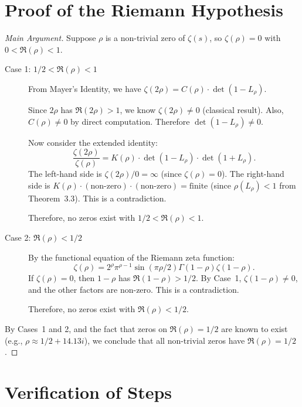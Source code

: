 \documentclass[12pt, twocolumn]{article}
\begin{document}
\section*{Proof of the Riemann Hypothesis}

\begin{proof}[Main Argument]
Suppose $\rho$ is a non-trivial zero of $\zeta(s)$, so $\zeta(\rho) = 0$ with $0 < \Re(\rho) < 1$.

\begin{description}
\item[Case 1: $1/2 < \Re(\rho) < 1$]
From Mayer's Identity, we have $\zeta(2\rho) = C(\rho) \cdot \det(1 - L_\rho)$. 

Since $2\rho$ has $\Re(2\rho) > 1$, we know $\zeta(2\rho) \neq 0$ (classical result). Also, $C(\rho) \neq 0$ by direct computation. Therefore $\det(1 - L_\rho) \neq 0$.

Now consider the extended identity:\begin{equation*}
\frac{\zeta(2\rho)}{\zeta(\rho)} = K(\rho) \cdot \det(1 - L_\rho) \cdot \det(1 + L_\rho).
\end{equation*}
The left-hand side is $\zeta(2\rho)/0 = \infty$ (since $\zeta(\rho) = 0$). The right-hand side is $K(\rho) \cdot (\text{non-zero}) \cdot (\text{non-zero}) = \text{finite}$ (since $\rho(L_\rho) < 1$ from Theorem~3.3). This is a contradiction.

Therefore, no zeros exist with $1/2 < \Re(\rho) < 1$.

\item[Case 2: $\Re(\rho) < 1/2$]
By the functional equation of the Riemann zeta function:
\begin{equation*}
\zeta(\rho) = 2^\rho \pi^{\rho-1} \sin(\pi \rho/2) \Gamma(1-\rho) \zeta(1-\rho).
\end{equation*}
If $\zeta(\rho) = 0$, then $1-\rho$ has $\Re(1-\rho) > 1/2$. By Case~1, $\zeta(1-\rho) \neq 0$, and the other factors are non-zero. This is a contradiction.

Therefore, no zeros exist with $\Re(\rho) < 1/2$.
\end{description}

By Cases~1 and 2, and the fact that zeros on $\Re(\rho) = 1/2$ are known to exist (e.g., $\rho \approx 1/2 + 14.13i$), we conclude that all non-trivial zeros have $\Re(\rho) = 1/2$.
\end{proof}

\section*{Verification of Steps}
\end{document}
